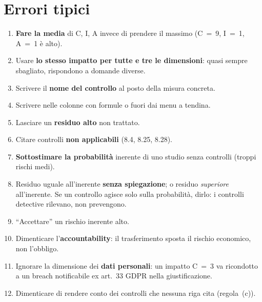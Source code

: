 \section{Errori tipici}
\begin{enumerate}
  \item \textbf{Fare la media} di C, I, A invece di prendere il massimo (C~=~9, I~=~1, A~=~1 è alto).
  \item Usare \textbf{lo stesso impatto per tutte e tre le dimensioni}: quasi sempre sbagliato, rispondono
    a domande diverse.
  \item Scrivere il \textbf{nome del controllo} al posto della misura concreta.
  \item Scrivere nelle colonne con formule o fuori dai menu a tendina.
  \item Lasciare un \textbf{residuo alto} non trattato.
  \item Citare controlli \textbf{non applicabili} (8.4, 8.25, 8.28).
  \item \textbf{Sottostimare la probabilità} inerente di uno studio senza controlli (troppi rischi medi).
  \item Residuo uguale all'inerente \textbf{senza spiegazione}; o residuo \emph{superiore} all'inerente.
    Se un controllo agisce solo sulla probabilità, dirlo: i controlli detective rilevano, non prevengono.
  \item ``Accettare'' un rischio inerente alto.
  \item Dimenticare l'\textbf{accountability}: il trasferimento sposta il rischio economico, non l'obbligo.
  \item Ignorare la dimensione dei \textbf{dati personali}: un impatto C~=~3 va ricondotto a un breach
    notificabile ex art.~33 GDPR nella giustificazione.
  \item Dimenticare di rendere conto dei controlli che nessuna riga cita (regola~(c)).
\end{enumerate}

